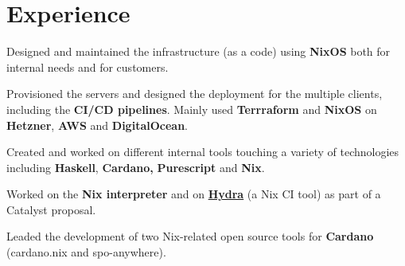 \documentclass[]{cv}
\begin{document}
%
%

%
%

%
%

\begin{minipage}[t]{0.75\textwidth}


\section{Experience}
\vspace{\topsep} %
\begin{tightemize}
\item Designed and maintained the infrastructure (as a code) using \textbf{NixOS} both for internal needs and for customers. 
\item Provisioned the servers and designed the deployment for the multiple clients, including the \textbf{CI/CD pipelines}. Mainly used \textbf{Terrraform} and \textbf{NixOS} on \textbf{Hetzner}, \textbf{AWS} and \textbf{DigitalOcean}.
\item Created and worked on different internal tools touching a variety of technologies including \textbf{Haskell}, \textbf{Cardano,} \textbf{Purescript} and \textbf{Nix}.
\item Worked on the \textbf{Nix interpreter} and on \href{https://github.com/NixOS/hydra/}{\textbf{Hydra}} (a Nix CI tool) as part of a Catalyst proposal.
\item Leaded the development of two Nix-related open source tools for \textbf{Cardano} (cardano.nix and spo-anywhere). 
\end{tightemize}
\sectionsep


\end{minipage}
\end{document}
